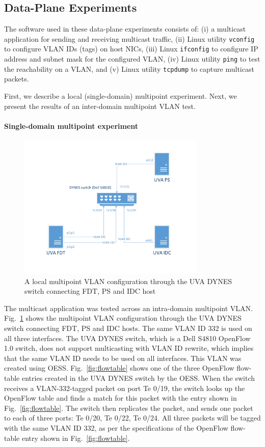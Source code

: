 \subsection{Data-Plane Experiments}
\label{sec:multipoint-data-plane}

The software used in these data-plane experiments consists of: (i) a multicast application for sending and receiving multicast traffic, (ii) Linux utility \texttt{vconfig} to configure VLAN IDs (tags) on host NICs,  (iii) Linux \texttt{ifconfig} to configure IP address and subnet mask for the configured VLAN, (iv) Linux utility \texttt{ping} to test the reachability on a VLAN, and (v) Linux utility \texttt{tcpdump} to capture multicast packets.

First, we describe a local (single-domain) multipoint experiment. Next, we present the results of
an inter-domain multipoint VLAN test.

\paragraph{Single-domain multipoint experiment}
\begin{figure}[htb!]
\centering
\includegraphics[width=0.8\textwidth]{figures/single-domain.pdf}
\caption{A local multipoint VLAN configuration through the UVA
DYNES switch connecting FDT, PS and IDC host}
\label{fig:single-domain}
\end{figure}

The multicast application was tested across an intra-domain multipoint VLAN. Fig.~\ref{fig:single-domain} shows the multipoint
VLAN configuration through the UVA DYNES switch connecting FDT, PS and IDC hosts. The same VLAN ID 332
is used on all three interfaces. The UVA DYNES switch, which is a Dell S4810 OpenFlow 1.0 switch, does not support multicasting
with VLAN ID rewrite, which implies that the same VLAN ID needs to be used on all interfaces.
This VLAN was created using OESS.
Fig.~\ref{fig:flowtable} shows one of the three OpenFlow flow-table entries created in the UVA DYNES switch by the OESS. When the switch receives a VLAN-332-tagged packet on port Te 0/19, the switch looks up the OpenFlow
table and finds a match for this packet with the entry shown in Fig.~\ref{fig:flowtable}. The switch then
replicates the packet, and sends one packet to each of three ports: Te 0/20, Te 0/22, Te 0/24. All three packets will be tagged with the same VLAN ID 332, as per the specifications of the OpenFlow flow-table entry
shown in Fig.~\ref{fig:flowtable}.

